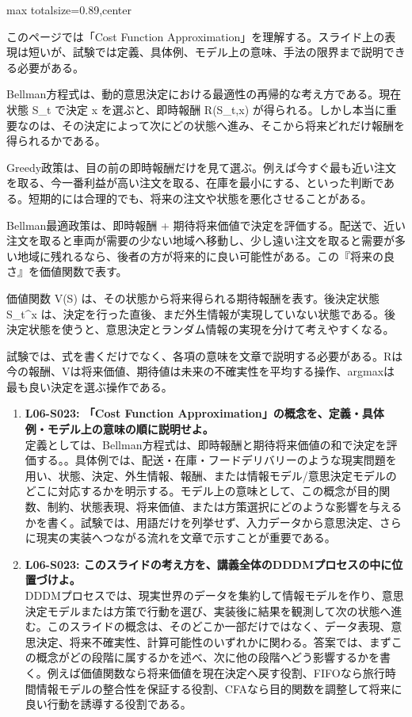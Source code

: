\begin{minipage}[t]{0.58\textwidth}
\begin{adjustbox}{max totalsize={\textwidth}{0.89\textheight},center}
\begin{minipage}{\textwidth}\scriptsize
{}このページでは「Cost Function Approximation」を理解する。スライド上の表現は短いが、試験では定義、具体例、モデル上の意味、手法の限界まで説明できる必要がある。\par
Bellman方程式は、動的意思決定における最適性の再帰的な考え方である。現在状態 S\_t で決定 x を選ぶと、即時報酬 R(S\_t,x) が得られる。しかし本当に重要なのは、その決定によって次にどの状態へ進み、そこから将来どれだけ報酬を得られるかである。\par
Greedy政策は、目の前の即時報酬だけを見て選ぶ。例えば今すぐ最も近い注文を取る、今一番利益が高い注文を取る、在庫を最小にする、といった判断である。短期的には合理的でも、将来の注文や状態を悪化させることがある。\par
Bellman最適政策は、即時報酬 + 期待将来価値で決定を評価する。配送で、近い注文を取ると車両が需要の少ない地域へ移動し、少し遠い注文を取ると需要が多い地域に残れるなら、後者の方が将来的に良い可能性がある。この『将来の良さ』を価値関数で表す。\par
価値関数 V(S) は、その状態から将来得られる期待報酬を表す。後決定状態 S\_t\textasciicircum{}x は、決定を行った直後、まだ外生情報が実現していない状態である。後決定状態を使うと、意思決定とランダム情報の実現を分けて考えやすくなる。\par
試験では、式を書くだけでなく、各項の意味を文章で説明する必要がある。Rは今の報酬、Vは将来価値、期待値は未来の不確実性を平均する操作、argmaxは最も良い決定を選ぶ操作である。\par{}\begin{enumerate}\item \textbf{L06-S023: 「Cost Function Approximation」の概念を、定義・具体例・モデル上の意味の順に説明せよ。}\\定義としては、Bellman方程式は、即時報酬と期待将来価値の和で決定を評価する。。具体例では、配送・在庫・フードデリバリーのような現実問題を用い、状態、決定、外生情報、報酬、または情報モデル/意思決定モデルのどこに対応するかを明示する。モデル上の意味として、この概念が目的関数、制約、状態表現、将来価値、または方策選択にどのような影響を与えるかを書く。試験では、用語だけを列挙せず、入力データから意思決定、さらに現実の実装へつながる流れを文章で示すことが重要である。\item \textbf{L06-S023: このスライドの考え方を、講義全体のDDDMプロセスの中に位置づけよ。}\\DDDMプロセスでは、現実世界のデータを集約して情報モデルを作り、意思決定モデルまたは方策で行動を選び、実装後に結果を観測して次の状態へ進む。このスライドの概念は、そのどこか一部だけではなく、データ表現、意思決定、将来不確実性、計算可能性のいずれかに関わる。答案では、まずこの概念がどの段階に属するかを述べ、次に他の段階へどう影響するかを書く。例えば価値関数なら将来価値を現在決定へ戻す役割、FIFOなら旅行時間情報モデルの整合性を保証する役割、CFAなら目的関数を調整して将来に良い行動を誘導する役割である。\end{enumerate}

\end{minipage}
\end{adjustbox}
\end{minipage}
